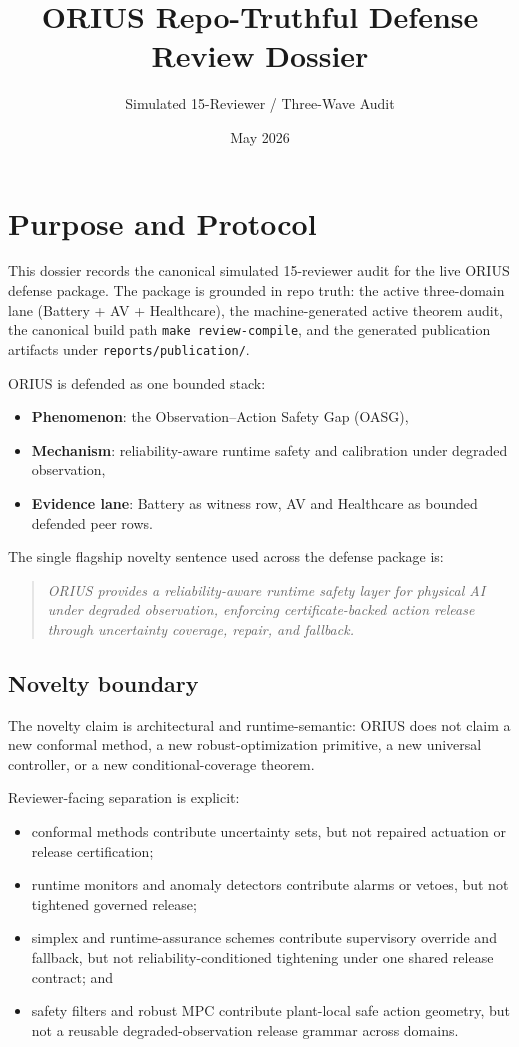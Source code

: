 \documentclass[11pt,oneside]{report}
\begin{document}
\hypersetup{pageanchor=false}
\title{ORIUS Repo-Truthful Defense Review Dossier}
\author{Simulated 15-Reviewer / Three-Wave Audit}
\date{May 2026}
\maketitle
\tableofcontents

\chapter{Purpose and Protocol}
This dossier records the canonical simulated 15-reviewer audit for the live
ORIUS defense package. The package is grounded in repo truth: the active
three-domain lane (Battery + AV + Healthcare), the machine-generated active
theorem audit, the canonical build path \texttt{make review-compile}, and the
generated publication artifacts under \texttt{reports/publication/}.

ORIUS is defended as one bounded stack:
\begin{itemize}
\item \textbf{Phenomenon}: the Observation--Action Safety Gap (OASG),
\item \textbf{Mechanism}: reliability-aware runtime safety and calibration under degraded observation,
\item \textbf{Evidence lane}: Battery as witness row, AV and Healthcare as bounded defended peer rows.
\end{itemize}

The single flagship novelty sentence used across the defense package is:
\begin{quote}
\emph{ORIUS provides a reliability-aware runtime safety layer for physical AI under degraded observation, enforcing certificate-backed action release through uncertainty coverage, repair, and fallback.}
\end{quote}

\section*{Novelty boundary}
The novelty claim is architectural and runtime-semantic: ORIUS does not claim a new
conformal method, a new robust-optimization primitive, a new universal controller, or a
new conditional-coverage theorem.

Reviewer-facing separation is explicit:
\begin{itemize}
\item conformal methods contribute uncertainty sets, but not repaired actuation or release certification;
\item runtime monitors and anomaly detectors contribute alarms or vetoes, but not tightened governed release;
\item simplex and runtime-assurance schemes contribute supervisory override and fallback, but not reliability-conditioned tightening under one shared release contract; and
\item safety filters and robust MPC contribute plant-local safe action geometry, but not a reusable degraded-observation release grammar across domains.
\end{itemize}
\end{document}
